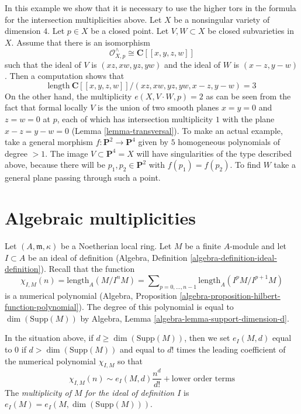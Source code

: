 \begin{example}
\label{example-naive-multiplicity-wrong}
In this example we show that it is necessary to use the higher
tors in the formula for the intersection multiplicities above.
Let $X$ be a nonsingular variety of dimension $4$.
Let $p \in X$ be a closed point. Let $V, W \subset X$
be closed subvarieties in $X$. Assume that there is an
isomorphism
$$
\mathcal{O}_{X, p}^\wedge \cong \mathbf{C}[[x, y, z, w]]
$$
such that the ideal of $V$ is $(xz, xw, yz, yw)$ and the ideal
of $W$ is $(x - z, y - w)$. Then a computation shows that
$$
\text{length}\ \mathbf{C}[[x, y, z, w]]/
(xz, xw, yz, yw, x - z, y - w) = 3
$$
On the other hand, the multiplicity $e(X, V \cdot W, p) = 2$
as can be seen from the fact that formal locally $V$ is the
union of two smooth planes $x = y = 0$ and $z = w = 0$ at $p$,
each of which has intersection multiplicity $1$ with the plane
$x - z = y - w = 0$ (Lemma \ref{lemma-transversal}). To make an
actual example, take
a general morphism $f : \mathbf{P}^2 \to \mathbf{P}^4$ given by
$5$ homogeneous polynomials of degree $> 1$. The image
$V \subset \mathbf{P}^4 = X$ will have singularities of the type
described above, because there will be $p_1, p_2 \in \mathbf{P}^2$
with $f(p_1) = f(p_2)$. To find $W$ take a general plane passing
through such a point.
\end{example}






\section{Algebraic multiplicities}
\label{section-multiplicities}

\noindent
Let $(A, \mathfrak m, \kappa)$ be a Noetherian local ring.
Let $M$ be a finite $A$-module and let $I \subset A$ be an ideal
of definition (Algebra, Definition \ref{algebra-definition-ideal-definition}).
Recall that the function
$$
\chi_{I, M}(n) = \text{length}_A(M/I^nM) =
\sum\nolimits_{p = 0, \ldots, n - 1} \text{length}_A(I^pM/I^{p + 1}M)
$$
is a numerical polynomial
(Algebra, Proposition \ref{algebra-proposition-hilbert-function-polynomial}).
The degree of this polynomial is equal to $\dim(\text{Supp}(M))$ by
Algebra, Lemma \ref{algebra-lemma-support-dimension-d}.

\begin{definition}
\label{definition-multiplicity}
In the situation above, if $d \geq \dim(\text{Supp}(M))$, then we set
$e_I(M, d)$ equal to $0$ if $d > \dim(\text{Supp}(M))$
and equal to $d!$ times the
leading coefficient of the numerical polynomial $\chi_{I, M}$ so that
$$
\chi_{I, M}(n) \sim e_I(M, d) \frac{n^d}{d!} + \text{lower order terms}
$$
The {\it multiplicity of $M$ for the ideal of definition $I$}
is $e_I(M) = e_I(M, \dim(\text{Supp}(M)))$.
\end{definition}

